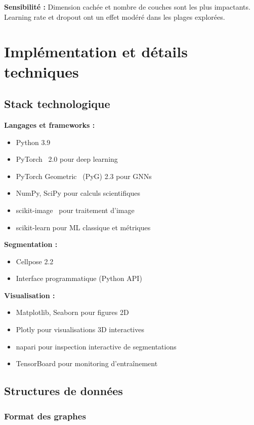 \textbf{Sensibilité :}
Dimension cachée et nombre de couches sont les plus impactants. Learning rate et dropout ont un effet modéré dans les plages explorées.

\section{Implémentation et détails techniques}

\subsection{Stack technologique}

\textbf{Langages et frameworks :}
\begin{itemize}
    \item Python 3.9
    \item PyTorch~\cite{Paszke2019} 2.0 pour deep learning
    \item PyTorch Geometric~\cite{Fey2019} (PyG) 2.3 pour GNNs
    \item NumPy, SciPy pour calculs scientifiques
    \item scikit-image~\cite{VanDerWalt2014} pour traitement d'image
    \item scikit-learn pour ML classique et métriques
\end{itemize}

\textbf{Segmentation :}
\begin{itemize}
    \item Cellpose 2.2
    \item Interface programmatique (Python API)
\end{itemize}

\textbf{Visualisation :}
\begin{itemize}
    \item Matplotlib, Seaborn pour figures 2D
    \item Plotly pour visualisations 3D interactives
    \item napari pour inspection interactive de segmentations
    \item TensorBoard pour monitoring d'entraînement
\end{itemize}

\subsection{Structures de données}

\subsubsection{Format des graphes}

